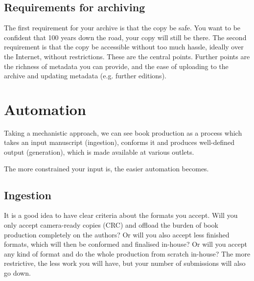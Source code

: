 \documentclass[nonflat,modfonts,output=book] {langsci/langscibook}
\begin{document}
\subsection{Requirements for archiving}
The first requirement for your archive is that the copy be safe. You want to be confident that 100 years down the road, your copy will still be there. The second requirement is that the copy be accessible without too much hassle, ideally over the Internet, without restrictions. These are the central points. Further points are the richness of metadata you can provide, and the ease of uploading to the archive and updating metadata (e.g. further editions).

\section{Automation}\label{sec:automation}
Taking a mechanistic approach, we can see book production as a process which takes an input manuscript (ingestion), conforms it and produces well-defined output (generation), which is   made available at various outlets.
 

The more constrained your input is, the easier automation becomes. 
 
                    
\subsection{Ingestion}
It is a good idea to have clear criteria about the formats you accept. Will you only accept camera-ready copies (CRC) and offload the burden of book production completely on the authors? Or will you also accept less finished formats, which will then be conformed and finalised in-house? Or will you accept any kind of format and do the whole production from scratch in-house? The more restrictive, the less work you will have, but your number of submissions will also go down. 
\end{document}
